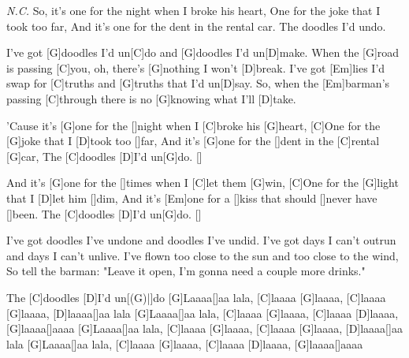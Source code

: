 


\begin{guitar}
	 {\footnotesize\textit{N.C.}}
	So, it's one for the night when I broke his heart,
	One for the joke that I took too far,
	And it's one for the dent in the rental car. 
	The doodles I'd undo.
	
	I've got [G]doodles I'd un[C]do and [G]doodles I'd un[D]make.
	When the [G]road is passing [C]you, oh, there's [G]nothing I won't [D]break.
	I've got [Em]lies I'd swap for [C]truths and [G]truths that I'd un[D]say.
	So, when the [Em]barman's passing [C]through there is no [G]knowing what I'll [D]take.
	
	'Cause it's [G]one for the []night when I [C]broke his [G]heart,
	[C]One for the [G]joke that I [D]took too []far,
	And it's [G]one for the []dent in the [C]rental [G]car,
	The [C]doodles [D]I'd un[G]do. []{}
	
	And it's [G]one for the []times when I [C]let them [G]win,
	[C]One for the [G]light that I [D]let him []dim,
	And it's [Em]one for a []kiss that should []never have []been. 
	The [C]doodles [D]I'd un[G]do. []{}
	
	I've got doodles I've undone and doodles I've undid.
	I've got days I can't outrun and days I can't unlive.
	I've flown too close to the sun and too close to the wind,
	So tell the barman: "Leave it open, I'm gonna need a couple more drinks."
	
	 
	The [C]doodles [D]I'd un[(G)|]{do} 
	\pagebreak
	[G]Laaaa[]aa lala, [C]laaaa [G]laaaa, [C]laaaa [G]laaaa, [D]laaaa[]aa lala
	[G]Laaaa[]aa lala, [C]laaaa [G]laaaa, [C]laaaa [D]laaaa, [G]laaaa[]aaaa
	[G]Laaaa[]aa lala, [C]laaaa [G]laaaa, [C]laaaa [G]laaaa, [D]laaaa[]aa lala
	[G]Laaaa[]aa lala, [C]laaaa [G]laaaa, [C]laaaa [D]laaaa, [G]laaaa[]aaaa
	

\end{guitar}
